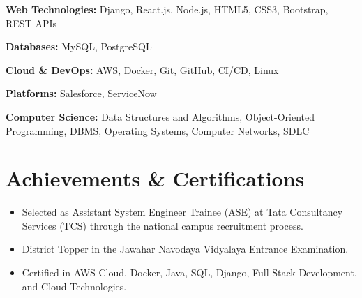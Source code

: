 \documentclass[10pt,a4paper]{article}
\begin{document}
\textbf{Web Technologies:} Django, React.js, Node.js, HTML5, CSS3, Bootstrap, REST APIs

\textbf{Databases:} MySQL, PostgreSQL

\textbf{Cloud \& DevOps:} AWS, Docker, Git, GitHub, CI/CD, Linux

\textbf{Platforms:} Salesforce, ServiceNow

\textbf{Computer Science:} Data Structures and Algorithms, Object-Oriented Programming, DBMS, Operating Systems, Computer Networks, SDLC

\section{Achievements \& Certifications}

\begin{itemize}
\item Selected as Assistant System Engineer Trainee (ASE) at Tata Consultancy Services (TCS) through the national campus recruitment process.
\item District Topper in the Jawahar Navodaya Vidyalaya Entrance Examination.
\item Certified in AWS Cloud, Docker, Java, SQL, Django, Full-Stack Development, and Cloud Technologies.
\end{itemize}

\end{document}
